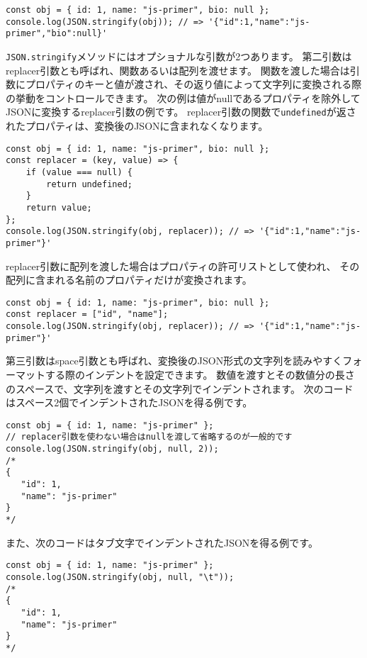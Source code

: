 \begin{lstlisting}
const obj = { id: 1, name: "js-primer", bio: null };
console.log(JSON.stringify(obj)); // => '{"id":1,"name":"js-primer","bio":null}'
\end{lstlisting}

\texttt{JSON.stringify}メソッドにはオプショナルな引数が2つあります。
第二引数はreplacer引数とも呼ばれ、関数あるいは配列を渡せます。
関数を渡した場合は引数にプロパティのキーと値が渡され、その返り値によって文字列に変換される際の挙動をコントロールできます。
次の例は値がnullであるプロパティを除外してJSONに変換するreplacer引数の例です。
replacer引数の関数で\texttt{undefined}が返されたプロパティは、変換後のJSONに含まれなくなります。

\begin{lstlisting}
const obj = { id: 1, name: "js-primer", bio: null };
const replacer = (key, value) => {
    if (value === null) {
        return undefined;
    }
    return value;
};
console.log(JSON.stringify(obj, replacer)); // => '{"id":1,"name":"js-primer"}'
\end{lstlisting}

replacer引数に配列を渡した場合はプロパティの許可リストとして使われ、
その配列に含まれる名前のプロパティだけが変換されます。

\begin{lstlisting}
const obj = { id: 1, name: "js-primer", bio: null };
const replacer = ["id", "name"];
console.log(JSON.stringify(obj, replacer)); // => '{"id":1,"name":"js-primer"}'
\end{lstlisting}

第三引数はspace引数とも呼ばれ、変換後のJSON形式の文字列を読みやすくフォーマットする際のインデントを設定できます。
数値を渡すとその数値分の長さのスペースで、文字列を渡すとその文字列でインデントされます。
次のコードはスペース2個でインデントされたJSONを得る例です。

\begin{lstlisting}
const obj = { id: 1, name: "js-primer" };
// replacer引数を使わない場合はnullを渡して省略するのが一般的です
console.log(JSON.stringify(obj, null, 2)); 
/*
{
   "id": 1,
   "name": "js-primer"
}
*/
\end{lstlisting}

また、次のコードはタブ文字でインデントされたJSONを得る例です。

\begin{lstlisting}
const obj = { id: 1, name: "js-primer" };
console.log(JSON.stringify(obj, null, "\t")); 
/*
{
   "id": 1,
   "name": "js-primer"
}
*/
\end{lstlisting}

